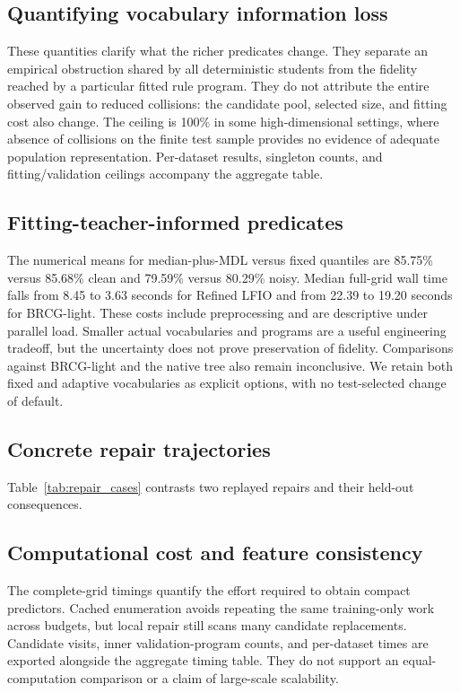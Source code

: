 \documentclass[a4paper,fleqn,review]{cas-sc}
\begin{document}
\subsection{Quantifying vocabulary information loss}\label{sec:ceiling-results}


These quantities clarify what the richer predicates change. They separate an empirical obstruction shared by all deterministic students from the fidelity reached by a particular fitted rule program. They do not attribute the entire observed gain to reduced collisions: the candidate pool, selected size, and fitting cost also change. The ceiling is 100\% in some high-dimensional settings, where absence of collisions on the finite test sample provides no evidence of adequate population representation. Per-dataset results, singleton counts, and fitting/validation ceilings accompany the aggregate table.

\subsection{Fitting-teacher-informed predicates}\label{sec:mdl-results}



The numerical means for median-plus-MDL versus fixed quantiles are 85.75\% versus 85.68\% clean and 79.59\% versus 80.29\% noisy. Median full-grid wall time falls from 8.45 to 3.63 seconds for Refined LFIO and from 22.39 to 19.20 seconds for BRCG-light. These costs include preprocessing and are descriptive under parallel load. Smaller actual vocabularies and programs are a useful engineering tradeoff, but the uncertainty does not prove preservation of fidelity. Comparisons against BRCG-light and the native tree also remain inconclusive. We retain both fixed and adaptive vocabularies as explicit options, with no test-selected change of default.

\subsection{Concrete repair trajectories}\label{sec:cases}
Table~\ref{tab:repair_cases} contrasts two replayed repairs and their held-out consequences.



\subsection{Computational cost and feature consistency}


The complete-grid timings quantify the effort required to obtain compact predictors. Cached enumeration avoids repeating the same training-only work across budgets, but local repair still scans many candidate replacements. Candidate visits, inner validation-program counts, and per-dataset times are exported alongside the aggregate timing table. They do not support an equal-computation comparison or a claim of large-scale scalability.
\end{document}
